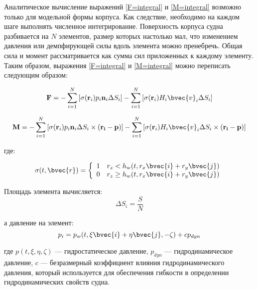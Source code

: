 Аналитическое вычисление выражений \eqref{F=integral} и \eqref{M=integral} возможно только для модельной формы корпуса. Как следствие, необходимо на каждом шаге выполнять численное интегрирование. Поверхность корпуса судна разбивается на $N$ элементов, размер которых настолько мал, что изменением давления или демпфирующей силы вдоль элемента можно пренебречь. Общая сила и момент рассматривается как сумма сил приложенных к каждому элементу. Таким образом, выражения \eqref{F=integral} и \eqref{M=integral} можно переписать следующим образом:

\begin{equation}
	\mathbf{F} = 
		-\sum_{i=1}^{N} \left[
			\sigma (\mathbf{r}_i) p_i \mathbf{n}_i \Delta S_i
		\right]
		-\sum_{i=1}^{N} \left[
			\sigma (\mathbf{r}_i) H_i \bvec{v}_i \Delta S_i
		\right]
		\label{ship_math:force_sum}
\end{equation}

\begin{equation}
	\mathbf{M} = 
		-\sum_{i=1}^{N} \left[
			\sigma (\mathbf{r}_i) p_i \mathbf{n}_i \Delta S_i \times (\mathbf{r_i} - \mathbf{p})
		\right]
		-\sum_{i=1}^{N} \left[
			\sigma (\mathbf{r}_i) H_i \bvec{v}_i \Delta S_i \times (\mathbf{r_i} - \mathbf{p})
		\right]
		\label{ship_math:torque_sum}
\end{equation}

где:

\begin{equation}
  \sigma(t,\bvec{r}) = \left\{
  \begin{array}{l l}
    1 & r_z		< 		h_w (t, r_x \bvec{i} + r_y \bvec{j}) \\
    0 & r_z		\geq 	h_w (t, r_x \bvec{i} + r_y \bvec{j}) \\
  \end{array} \right.
\end{equation}

Площадь элемента вычисляется:
\begin{equation}
	\Delta S_i = \frac{S}{N}
\end{equation}

а давление на элемент:
\begin{equation}
	p_i = p_w(t, \xi \bvec{i} + \eta \bvec{j}, -\zeta) + c p_{dyn}
\end{equation}

где $p(t, \xi, \eta, \zeta)$ --- гидростатическое давление, $p_{dyn}$ --- гидродинамическое давление, $c$ --- безразмерный коэффициент влияния гидродинамического давления, который используется для обеспечения гибкости в определении гидродинамических свойств судна.

